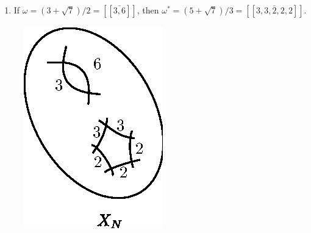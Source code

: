 \begin{examples*}
\begin{enumerate}[(1)]
\item If $\omega = (3 + \sqrt{7} ) /2 = [[\bar{3,6}]] $, then $\omega^* =
  (5 + \sqrt{7}) / 3 = [ [\bar{3, 3, 2, 2, 2}] ]$. 
\end{enumerate}
\begin{figure}[H]
\centering 
\includegraphics{vol58-fig/fig58-86.eps} 
\end{figure}
\end{examples*}


